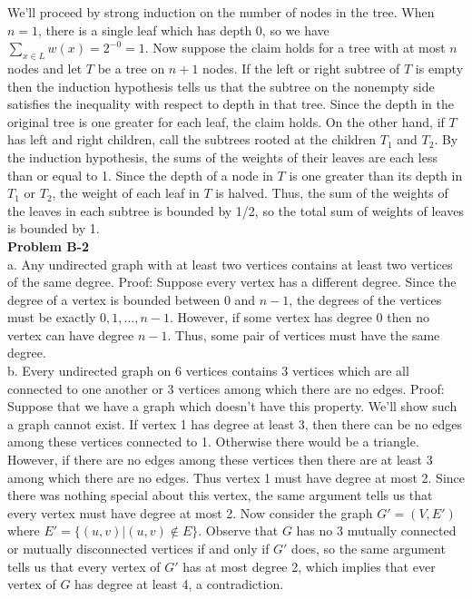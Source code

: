 \documentclass{article}
\begin{document}
We'll proceed by strong induction on the number of nodes in the tree.  When $n=1$, there is a single leaf which has depth 0, so we have $\sum_{x \in L} w(x) = 2^{-0} = 1$.  Now suppose the claim holds for a tree with at most $n$ nodes and let $T$ be a tree on $n+1$ nodes.  If the left or right subtree of $T$ is empty then the induction hypothesis tells us that the subtree on the nonempty side satisfies the inequality with respect to depth in that tree.  Since the depth in the original tree is one greater for each leaf, the claim holds. On the other hand, if $T$ has left and right children, call the subtrees rooted at the children $T_1$ and $T_2$.  By the induction hypothesis, the sums of the weights of their leaves are each less than or equal to 1.  Since the depth of a node in $T$ is one greater than its depth in $T_1$ or $T_2$, the weight of each leaf in $T$ is halved.  Thus, the sum of the weights of the leaves in each subtree is bounded by 1/2, so the total sum of weights of leaves is bounded by 1. \\

\noindent\textbf{Problem B-2}\\

a. Any undirected graph with at least two vertices contains at least two vertices of the same degree.  Proof: Suppose every vertex has a different degree.  Since the degree of a vertex is bounded between 0 and $n-1$, the degrees of the vertices must be exactly $0, 1, \ldots, n-1$.  However, if some vertex has degree 0 then no vertex can have degree $n-1$.  Thus, some pair of vertices must have the same degree. \\

b. Every undirected graph on 6 vertices contains 3 vertices which are all connected to one another or 3 vertices among which there are no edges.  Proof:  Suppose that we have a graph which doesn't have this property.  We'll show such a graph cannot exist.  If vertex 1 has degree at least 3, then there can be no edges among these vertices connected to 1.  Otherwise there would be a triangle.  However, if there are no edges among these vertices then there are at least 3 among which there are no edges.  Thus vertex 1 must have degree at most 2.  Since there was nothing special about this vertex, the same argument tells us that every vertex must have degree at most 2.  Now consider the graph $G' = (V, E')$ where $E' = \{(u,v) | (u,v) \notin E\}$.  Observe that $G$ has no 3 mutually connected or mutually disconnected vertices if and only if $G'$ does, so the same argument tells us that every vertex of $G'$ has at most degree 2, which implies that ever vertex of $G$ has degree at least 4, a contradiction.\\
\end{document}

